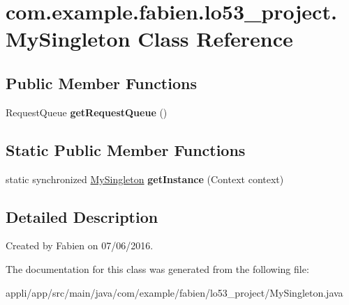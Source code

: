 \hypertarget{classcom_1_1example_1_1fabien_1_1lo53__project_1_1MySingleton}{\section{com.\-example.\-fabien.\-lo53\-\_\-project.\-My\-Singleton Class Reference}
\label{classcom_1_1example_1_1fabien_1_1lo53__project_1_1MySingleton}
}
\subsection*{Public Member Functions}
\begin{DoxyCompactItemize}
\item 
\hypertarget{classcom_1_1example_1_1fabien_1_1lo53__project_1_1MySingleton_a776e1f11fb39ca20e4a73a49e41eec1b}{Request\-Queue {\bfseries get\-Request\-Queue} ()}\label{classcom_1_1example_1_1fabien_1_1lo53__project_1_1MySingleton_a776e1f11fb39ca20e4a73a49e41eec1b}

\end{DoxyCompactItemize}
\subsection*{Static Public Member Functions}
\begin{DoxyCompactItemize}
\item 
\hypertarget{classcom_1_1example_1_1fabien_1_1lo53__project_1_1MySingleton_acb6746adad651c17ef1b1c56d715c576}{static synchronized \hyperlink{classcom_1_1example_1_1fabien_1_1lo53__project_1_1MySingleton}{My\-Singleton} {\bfseries get\-Instance} (Context context)}\label{classcom_1_1example_1_1fabien_1_1lo53__project_1_1MySingleton_acb6746adad651c17ef1b1c56d715c576}

\end{DoxyCompactItemize}


\subsection{Detailed Description}
Created by Fabien on 07/06/2016. 

The documentation for this class was generated from the following file\-:\begin{DoxyCompactItemize}
\item 
appli/app/src/main/java/com/example/fabien/lo53\-\_\-project/My\-Singleton.\-java\end{DoxyCompactItemize}
